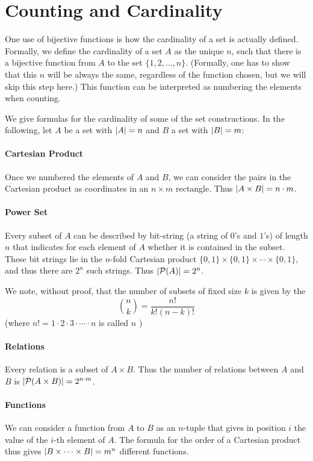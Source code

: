 \section{Counting and Cardinality}
\label{defcardinality}

One use of bijective functions is how the cardinality of a set is actually defined.
Formally, we
define the cardinality of a set $A$ as the unique $n$, such that there is a bijective
function from $A$ to the set $\{1,2,\ldots,n\}$. (Formally, one has to show that this
$n$ will be always the same, regardless of the function chosen, but we will skip this
step here.) This function can be interpreted as numbering the elements when counting.

We give formulas for the cardinality of some of the set constructions. In the following,
let $A$ be a set with $\left|A\right|=n$ and $B$ a set with $\left|B\right|=m$:

\paragraph{Cartesian Product}
Once we numbered the elements of $A$ and $B$, we can consider the pairs in the Cartesian
product as coordinates in an $n\times m$ rectangle. Thus $\left|A\times B\right|=n\cdot m$.

\paragraph{Power Set}
Every subset of $A$ can be described by bit-string (a string of $0$'s and
$1$'s) of length $n$ that indicates for each
element of $A$ whether it is contained in the subset. These bit strings lie in the
$n$-fold Cartesian product $\{0,1\}\times\{0,1\}\times\cdots\times\{0,1\}$, and thus
there are $2^n$ such strings. Thus $\left|{\mathcal P}(A)\right|=2^n$.

We note, without proof, that the number of subsets of fixed size $k$ is given by the
\[
{n\choose k}=\frac{n!}{k!(n-k)!}
\]
(where $n!=1\cdot 2\cdot 3\cdot\cdots\cdot n$ is called $n$ )

\paragraph{Relations}
Every relation is a subset of $A\times B$. Thus the number of relations between $A$ and
$B$ is $\left|{\mathcal P}(A\times B)\right|=2^{n\cdot m}$.

\paragraph{Functions}
We can consider a function from $A$ to $B$ as an $n$-tuple that gives in position $i$
the value of the $i$-th element of $A$. The formula for the order of a Cartesian product
thus gives $\left|B\times \cdots\times B\right|=m^n$ different functions.

